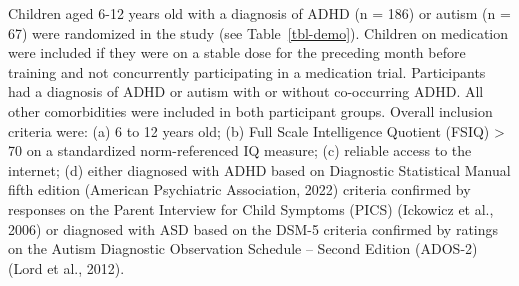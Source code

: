 \documentclass[
  letterpaper,
]{ut-thesis}
\begin{document}
Children aged 6-12 years old with a diagnosis of ADHD (n = 186) or
autism (n = 67) were randomized in the study (see Table~\ref{tbl-demo}).
Children on medication were included if they were on a stable dose for
the preceding month before training and not concurrently participating
in a medication trial. Participants had a diagnosis of ADHD or autism
with or without co-occurring ADHD. All other comorbidities were included
in both participant groups. Overall inclusion criteria were: (a) 6 to 12
years old; (b) Full Scale Intelligence Quotient (FSIQ) \textgreater{} 70
on a standardized norm-referenced IQ measure; (c) reliable access to the
internet; (d) either diagnosed with ADHD based on Diagnostic Statistical
Manual fifth edition (American Psychiatric Association, 2022) criteria
confirmed by responses on the Parent Interview for Child Symptoms (PICS)
(Ickowicz et al., 2006) or diagnosed with ASD based on the DSM-5
criteria confirmed by ratings on the Autism Diagnostic Observation
Schedule -- Second Edition (ADOS-2) (Lord et al., 2012).
\end{document}
